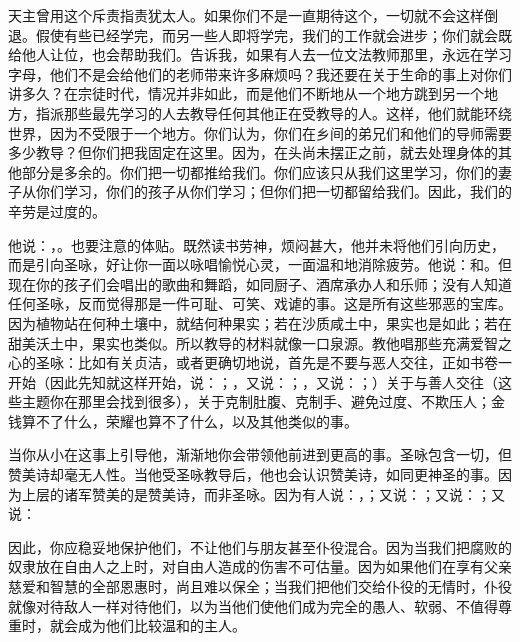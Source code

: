 天主曾用这个斥责指责犹太人。如果你们不是一直期待这个，一切就不会这样倒退。假使有些已经学完，而另一些人即将学完，我们的工作就会进步；你们就会既给他人让位，也会帮助我们。告诉我，如果有人去一位文法教师那里，永远在学习字母，他们不是会给他们的老师带来许多麻烦吗？我还要在关于生命的事上对你们讲多久？在宗徒时代，情况并非如此，而是他们不断地从一个地方跳到另一个地方，指派那些最先学习的人去教导任何其他正在受教导的人。这样，他们就能环绕世界，因为不受限于一个地方。你们认为，你们在乡间的弟兄们和他们的导师需要多少教导？但你们把我固定在这里。因为，在头尚未摆正之前，就去处理身体的其他部分是多余的。你们把一切都推给我们。你们应该只从我们这里学习，你们的妻子从你们学习，你们的孩子从你们学习；但你们把一切都留给我们。因此，我们的辛劳是过度的。\par

他说：，。也要注意的体贴。既然读书劳神，烦闷甚大，他并未将他们引向历史，而是引向圣咏，好让你一面以咏唱愉悦心灵，一面温和地消除疲劳。他说：和。但现在你的孩子们会唱出的歌曲和舞蹈，如同厨子、酒席承办人和乐师；没有人知道任何圣咏，反而觉得那是一件可耻、可笑、戏谑的事。这是所有这些邪恶的宝库。因为植物站在何种土壤中，就结何种果实；若在沙质咸土中，果实也是如此；若在甜美沃土中，果实也类似。所以教导的材料就像一口泉源。教他唱那些充满爱智之心的圣咏：比如有关贞洁，或者更确切地说，首先是不要与恶人交往，正如书卷一开始（因此先知就这样开始，说：；，又说：；，又说：；）关于与善人交往（这些主题你在那里会找到很多），关于克制肚腹、克制手、避免过度、不欺压人；金钱算不了什么，荣耀也算不了什么，以及其他类似的事。\par

当你从小在这事上引导他，渐渐地你会带领他前进到更高的事。圣咏包含一切，但赞美诗却毫无人性。当他受圣咏教导后，他也会认识赞美诗，如同更神圣的事。因为上层的诸军赞美的是赞美诗，而非圣咏。因为有人说：，；又说：；又说：；又说：\par

因此，你应稳妥地保护他们，不让他们与朋友甚至仆役混合。因为当我们把腐败的奴隶放在自由人之上时，对自由人造成的伤害不可估量。因为如果他们在享有父亲慈爱和智慧的全部恩惠时，尚且难以保全；当我们把他们交给仆役的无情时，仆役就像对待敌人一样对待他们，以为当他们使他们成为完全的愚人、软弱、不值得尊重时，就会成为他们比较温和的主人。\par

